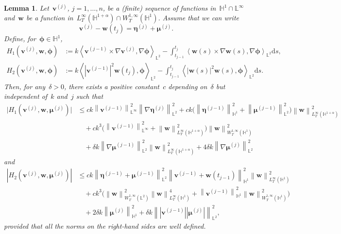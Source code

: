 \documentclass[10pt,a4paper]{amsart}
\newtheorem{lemma}{Lemma}
\newcommand{\bb}{\mathbb}
\newcommand{\bff}{\boldsymbol}
\newcommand{\ds}{\mathrm{d}s}
\newcommand{\inpro}[2]{\left\langle#1,#2\right\rangle}
\newcommand{\nn}{\nonumber}
\newcommand{\norm}[2]{\left\|{#1}\right\|_{#2}}
\begin{document}
\begin{lemma}
	\label{lem:aux lem}
	Let~$\bff{v}^{(j)}$, $j=1,\ldots,n$, be a (finite) sequence of functions
	in~$\bb{H}^1\cap \bb{L}^\infty$ and~$\bff{w}$ be a function in~$L^\infty_T(\bb{H}^{1+\alpha})\cap
	W^{1,\infty}_T(\bb{H}^1)$. Assume that we can write
	\[
	\bff{v}^{(j)} - \bff{w}(t_j)
	=
	\bff{\eta}^{(j)} + \bff{\mu}^{(j)}.
	\]
	Define, for~$\bff{\phi}\in\bb{H}^1$,
	\begin{align*} 
		H_1(\bff{v}^{(j)},\bff{w},\bff{\phi})
		&:=
		k \inpro{\bff{v}^{(j-1)} \times \nabla\bff{v}^{(j)}}%
		{\nabla\bff{\phi}}_{\bb{L}^2}
		-
		\int_{t_{j-1}}^{t_j} 
		\inpro{\bff{w}(s) \times \nabla\bff{w}(s)}%
		{\nabla\bff{\phi}}_{\bb{L}^2} \ds,
		\\
		H_2(\bff{v}^{(j)},\bff{w},\bff{\phi})
		&:=
		k \inpro{|\bff{v}^{(j-1)}|^2 \bff{w}(t_j)}{\bff{\phi}}_{\bb{L}^2}
		-
		\int_{t_{j-1}}^{t_j} 
		\inpro{|\bff{w}(s)|^2 \bff{w}(s)}{\bff{\phi}}_{\bb{L}^2} \ds.
	\end{align*}
	Then, for any~$ \delta>0$, there exists a positive constant~$c$
	depending on~$\delta$ but independent of~$k$ and~$j$ such that
	\begin{align}\label{equ:H1 vj}
			\big| H_1(\bff{v}^{(j)},\bff{w},\bff{\mu}^{(j)}) \big|
			&\le
			ck\norm{\bff{v}^{(j-1)}}{\bb{L}^\infty}^2
			\norm{\nabla\bff{\eta}^{(j)}}{\bb{L}^2}^2
			+
			ck
			\Big(\norm{\bff{\eta}^{(j-1)}}{\bb{H}^1}^2
			+ \norm{\bff{\mu}^{(j-1)}}{\bb{L}^2}^2 \Big)
			\norm{\bff{w}}{L^\infty_T(\bb{H}^{1+\alpha})}^2
			\nn\\
			&\quad
			+
			c k^3
			\Big(
			\norm{\bff{v}^{(j-1)}}{\bb{L}^\infty}^2
			+
			\norm{\bff{w}}{L^\infty_T(\bb{H}^{1+\alpha})}^2
			\Big)  	\norm{\bff{w}}{W^{1,\infty}_T(\bb{H}^1)}^2
			\nn\\
			&\quad
			+ \delta k \norm{\nabla\bff{\mu}^{(j-1)}}{\bb{L}^2}^2 \norm{\bff{w}}{L^\infty_T(\bb{H}^{1+\alpha})}^2
			+ 4 \delta k \norm{\nabla\bff{\mu}^{(j)}}{\bb{L}^2}^2
	\end{align}
	and
	\begin{align}\label{equ:H2 vj}
			| H_2(\bff{v}^{(j)},\bff{w},\bff{\mu}^{(j)}) |
			&\le
			ck
			\norm{\bff{\eta}^{(j-1)}+\bff{\mu}^{(j-1)}}{\bb{L}^2}^2
			\norm{\bff{v}^{(j-1)}+\bff{w}(t_{j-1})}{\bb{H}^1}^2
			\norm{\bff{w}}{L^\infty_T(\bb{H}^1)}^2
			\nn\\
			&\quad
			+
			ck^3
			\Big(
			\norm{\bff{w}}{W^{1,\infty}_T(\bb{L}^2)}^2
			\norm{\bff{w}}{L^\infty_T(\bb{H}^1)}^4
			+
			\norm{\bff{v}^{(j-1)}}{\bb{H}^1}^2
			\norm{\bff{w}}{W^{1,\infty}_T(\bb{H}^1)}^2
			\Big)
			\nn\\
			&\quad
			+
			2 \delta k \norm{\bff{\mu}^{(j)}}{\bb{H}^1}^2
			+
			\delta k
			\norm{|\bff{v}^{(j-1)}||\bff{\mu}^{(j)}|}{\bb{L}^2}^2,
	\end{align}
	provided that all the norms on the right-hand sides are well defined.


\end{lemma}
\end{document}
